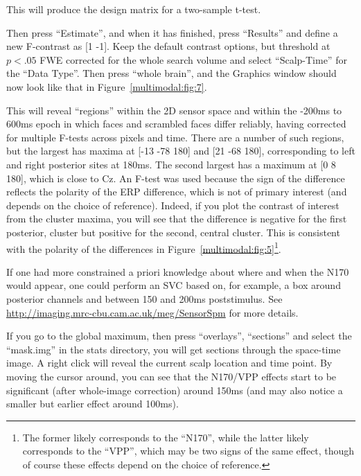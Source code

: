 This will produce the design matrix for a two-sample t-test.

Then press ``Estimate'', and when it has finished, press ``Results'' and define a new F-contrast as [1 -1]. Keep the default contrast options, but threshold at $p<.05$ FWE corrected for the whole search volume and select ``Scalp-Time'' for the ``Data Type''. Then press ``whole brain'', and the Graphics window should now look like that in Figure~\ref{multimodal:fig:7}.

This will reveal ``regions'' within the 2D sensor space and within the -200ms to 600ms epoch in which faces and scrambled faces differ reliably, having corrected for multiple F-tests across pixels and time. There are a number of such regions, but the largest has maxima at [-13 -78 180] and [21 -68 180], corresponding to left and right posterior sites at 180ms. The second largest has a maximum at [0 8 180], which is close to Cz. An F-test was used because the sign of the difference reflects the polarity of the ERP difference, which is not of primary interest (and depends on the choice of reference). Indeed, if you plot the contrast of interest from the cluster maxima, you will see that the difference is negative for the first posterior, cluster but positive for the second, central cluster. This is consistent with the polarity of the differences in Figure~\ref{multimodal:fig:5}\footnote{The former likely corresponds to the ``N170'', while the latter likely corresponds to the ``VPP'', which may be two signs of the same effect, though of course these effects depend on the choice of reference.}.

If one had more constrained a priori knowledge about where and when the N170 would appear, one could perform an SVC based on, for example, a box around posterior channels and between 150 and 200ms poststimulus. See \url{http://imaging.mrc-cbu.cam.ac.uk/meg/SensorSpm} for more details.

If you go to the global maximum, then press ``overlays'', ``sections'' and select the ``mask.img'' in the stats directory, you will get sections through the space-time image. A right click will reveal the current scalp location and time point. By moving the cursor around, you can see that the N170/VPP effects start to be significant (after whole-image correction) around 150ms (and may also notice a smaller but earlier effect around 100ms).

